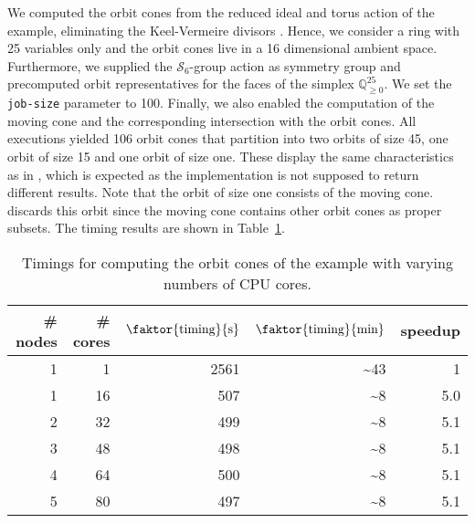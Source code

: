 We computed the orbit cones from the reduced ideal and torus action of the \msix{} example, eliminating the Keel-Vermeire divisors . Hence, we consider a ring with 25 variables only and the orbit cones live in a 16 dimensional ambient space. Furthermore, we supplied the $\mathcal{S}_6$-group action as symmetry group and precomputed orbit representatives for the faces of the simplex $\mathbb{Q}_{\geq 0}^{25}$. We set the \texttt{job-size} parameter to 100. Finally, we also enabled the computation of the moving cone and the corresponding intersection with the orbit cones.  All executions yielded 106 orbit cones that partition into two orbits of size 45, one orbit of size 15 and one orbit of size one. These display the same characteristics as in \cite[Remark 6.7]{gitfan_symmetry}, which is expected as the \gitfanlib{} implementation is not supposed to return different results. Note that the orbit of size one consists of the moving cone. \gitfanlib{} discards this orbit since the moving cone contains other orbit cones as proper subsets. The timing results are shown in Table~\ref{table:performance_orbit_cones}.

\begin{table}
	\centering
	\begin{tabular}{@{}rrrrr@{}}
		\toprule
		\# nodes & \# cores & $\faktor{\text{timing}}{\text{s}}$ & $\faktor{\text{timing}}{\text{min}}$ & speedup \\
		\midrule
		1 & 1  & 2561 & \textasciitilde 43 & 1   \\
		1 & 16 & 507  & \textasciitilde 8  & 5.0 \\
		2 & 32 & 499  & \textasciitilde 8  & 5.1 \\
		3 & 48 & 498  & \textasciitilde 8  & 5.1 \\
		4 & 64 & 500  & \textasciitilde 8  & 5.1 \\
		5 & 80 & 497  & \textasciitilde 8  & 5.1 \\
		\bottomrule
	\end{tabular}
	\caption{Timings for computing the orbit cones of the \msix{} example with varying numbers of CPU cores.}
	\label{table:performance_orbit_cones}
\end{table}

